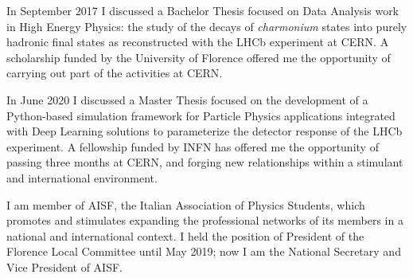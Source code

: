 \documentclass[a4, 11pt]{report}
\begin{document}
    \vskip 3mm
    
    \noindent
    In September 2017 I discussed a Bachelor Thesis focused on Data Analysis work in High Energy Physics: the study of the decays of \textit{charmonium} states into purely hadronic final states as reconstructed with the LHCb experiment at CERN. A scholarship funded by the University of Florence offered me the opportunity of carrying out part of the activities at CERN.

    \vskip 3mm
    
    \noindent
    In June 2020 I discussed a Master Thesis focused on the development of a Python-based simulation framework for Particle Physics applications integrated with Deep Learning solutions to parameterize the detector response of the LHCb experiment. A fellowship funded by INFN has offered me the opportunity of passing three months at CERN, and forging new relationships within a stimulant and international environment.
    
    \vskip 3mm
    
    \noindent
    I am member of AISF, the Italian Association of Physics Students, which promotes and stimulates expanding the professional networks of its members in a national and international context. I held the position of President of the Florence Local Committee until May 2019; now I am the National Secretary and Vice President of AISF.
    
    \vskip 9mm
    
\end{document}
